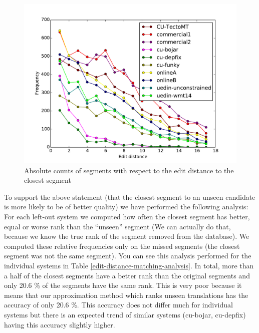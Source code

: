\begin{figure}
    \begin{center}
        \includegraphics[width=14cm]{img/absolute-counts-per-distance.pdf}
    \end{center}

    \caption[Absolute counts of matched segments with respect to the edit distance]
    {Absolute counts of segments with respect to the edit distance to the closest
    segment}

    \label{absolute-counts-per-distance}
\end{figure}


To support the above statement (that the closest segment to an unseen candidate
is more likely to be of better quality) we have performed the following
analysis: For each left-out system we computed how often the closest segment
has better, equal or worse rank than the ``unseen'' segment (We can actually do
that, because we know the true rank of the segment removed from the database).
We computed these relative frequencies only on the missed segments (the closest
segment was not the same segment). You can see this analysis performed for the
individual systems in Table \ref{edit-distance-matching-analysis}.  In total,
more than a half of the closest segments have a better rank than the original
segments and only 20.6 \% of the segments have the same rank. This is very poor
because it means that our approximation method which ranks unseen translations
has the accuracy of only 20.6 \%. This accuracy does not differ much for
individual systems but there is an expected trend of similar systems (cu-bojar,
cu-depfix) having this accuracy slightly higher. 


